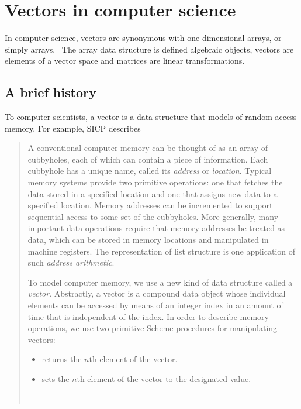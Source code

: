 \label{sec:array_history}
\section{Vectors in computer science}

In computer science, vectors are synonymous with one-dimensional arrays, or simply arrays.~\cite{Knuth1967,Pratt2001} The array data structure is
defined algebraic objects, vectors are elements of a vector space and matrices are linear transformations.

\subsection{A brief history}

To computer scientists, a vector is a data structure that models of random access memory. For example, SICP describes

\begin{quote}
A conventional computer memory can be thought of as an array of cubbyholes, each of which can contain a piece of information. Each cubbyhole has a unique name, called its \textit{address} or \textit{location}. Typical memory systems provide two primitive operations: one that fetches the data stored in a specified location and one that assigns new data to a specified location. Memory addresses can be incremented to support sequential access to some set of the cubbyholes. More generally, many important data operations require that memory addresses be treated as data, which can be stored in memory locations and manipulated in machine registers. The representation of list structure is one application of such \textit{address arithmetic}.

To model computer memory, we use a new kind of data structure called a \textit{vector}. Abstractly, a vector is a compound data object whose individual elements can be accessed by means of an integer index in an amount of time that is independent of the index. In order to describe memory operations, we use two primitive Scheme procedures for manipulating vectors:

\begin{itemize}
\item
{} returns the $n$th element of the vector.

\item
{} sets the $n$th element of the vector to the designated value.
\end{itemize}--\cite[\S 5.3.1]{sicp}
\end{quote}

